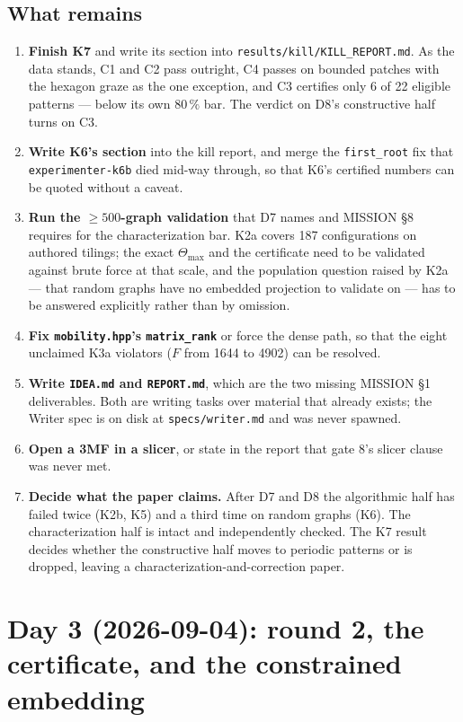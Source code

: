 \documentclass[10pt,a4paper]{article}
\newcommand{\fn}[1]{\nolinkurl{#1}}
\begin{document}
\subsection{What remains}

\begin{enumerate}[leftmargin=6mm]
\item \textbf{Finish K7} and write its section into \fn{results/kill/KILL_REPORT.md}. As the data
stands, C1 and C2 pass outright, C4 passes on bounded patches with the hexagon graze as the one
exception, and C3 certifies only 6 of 22 eligible patterns --- below its own $80\,\%$ bar. The
verdict on D8's constructive half turns on C3.
\item \textbf{Write K6's section} into the kill report, and merge the \fn{first_root} fix that
\texttt{experimenter-k6b} died mid-way through, so that K6's certified numbers can be quoted
without a caveat.
\item \textbf{Run the $\ge500$-graph validation} that D7 names and MISSION \S8 requires for the
characterization bar. K2a covers 187 configurations on authored tilings; the exact
$\Theta_{\max}$ and the certificate need to be validated against brute force at that scale, and
the population question raised by K2a --- that random graphs have no embedded projection to
validate on --- has to be answered explicitly rather than by omission.
\item \textbf{Fix \fn{mobility.hpp}'s \fn{matrix_rank}} or force the dense path, so that the
eight unclaimed K3a violators ($F$ from 1644 to 4902) can be resolved.
\item \textbf{Write \fn{IDEA.md} and \fn{REPORT.md}}, which are the two missing MISSION \S1
deliverables. Both are writing tasks over material that already exists; the Writer spec is on
disk at \fn{specs/writer.md} and was never spawned.
\item \textbf{Open a 3MF in a slicer}, or state in the report that gate 8's slicer clause was
never met.
\item \textbf{Decide what the paper claims.} After D7 and D8 the algorithmic half has failed
twice (K2b, K5) and a third time on random graphs (K6). The characterization half is intact and
independently checked. The K7 result decides whether the constructive half moves to periodic
patterns or is dropped, leaving a characterization-and-correction paper.
\end{enumerate}

\section{Day 3 (2026-09-04): round 2, the certificate, and the constrained embedding}
\end{document}

